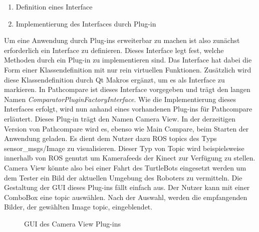 \begin{enumerate}
  \item Definition eines Interface
  \item Implementierung des Interfaces durch Plug-in
\end{enumerate}

Um eine Anwendung durch Plug-ins erweiterbar zu machen ist also zunächst erforderlich ein
Interface zu definieren. Dieses Interface legt fest, welche Methoden durch ein
Plug-in zu implementieren sind. Das Interface hat dabei
die Form einer Klassendefinition mit nur rein virtuellen Funktionen. Zusätzlich
wird diese Klassendefinition durch Qt Makros ergänzt, um es als Interface zu
markieren. In Pathcompare ist dieses Interface vorgegeben und trägt den langen
Namen \textit{ComparatorPluginFactoryInterface}. Wie die Implementierung dieses
Interfaces erfolgt, wird nun anhand eines vorhandenen Plug-ins für Pathcompare erläutert.
Dieses Plug-in trägt den Namen Camera View. In der derzeitigen Version von
Pathcompare wird es, ebenso wie Main Compare, beim Starten der Anwendung geladen.
Es dient dem Nutzer dazu ROS topics des Typs sensor\_msgs/Image zu
visualisieren. Dieser Typ von Topic wird beispielsweise innerhalb von ROS
genutzt um Kamerafeeds der Kinect zur Verfügung zu stellen. Camera View könnte also
bei einer Fahrt des TurtleBots eingesetzt werden um dem Tester ein Bild der
aktuellen Umgebung des Roboters zu vermitteln. Die Gestaltung der GUI dieses
Plug-ins fällt einfach aus. Der Nutzer kann mit einer ComboBox eine topic
auswählen. Nach der Auswahl, werden die empfangenden Bilder, der gewählten Image
topic, eingeblendet. 

\begin{figure}[t]
  \begin{center}
  \end{center}
  \caption{GUI des Camera View Plug-ins}
  \label{fig:cameraview}
\end{figure}

